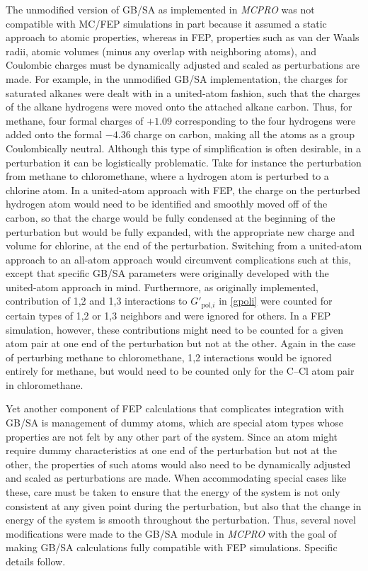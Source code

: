\documentclass[12pt]{report}
\begin{document}
The unmodified version of GB/SA as implemented in \textit{MCPRO} was not compatible with MC/FEP simulations in part because it assumed a static approach to atomic properties, whereas in FEP, properties such as van der Waals radii, atomic volumes (minus any overlap with neighboring atoms), and Coulombic charges must be dynamically adjusted and scaled as perturbations are made. For example, in the unmodified GB/SA implementation, the charges for saturated alkanes were dealt with in a united-atom fashion, such that the charges of the alkane hydrogens were moved onto the attached alkane carbon. Thus, for methane, four formal charges of $+1.09$ corresponding to the four hydrogens were added onto the formal $-4.36$ charge on carbon, making all the atoms as a group Coulombically neutral. Although this type of simplification is often desirable, in a perturbation it can be logistically problematic. Take for instance the perturbation from methane to chloromethane, where a hydrogen atom is perturbed to a chlorine atom. In a united-atom approach with FEP, the charge on the perturbed hydrogen atom would need to be identified and smoothly moved off of the carbon, so that the charge would be fully condensed at the beginning of the perturbation but would be fully expanded, with the appropriate new charge and volume for chlorine, at the end of the perturbation. Switching from a united-atom approach to an all-atom approach would circumvent complications such at this, except that specific GB/SA parameters were originally developed with the united-atom approach in mind. Furthermore, as originally implemented, contribution of 1,2 and 1,3 interactions to $G'_{\textrm{pol,}i}$ in \cref{gpoli} were counted for certain types of 1,2 or 1,3 neighbors and were ignored for others. In a FEP simulation, however, these contributions might need to be counted for a given atom pair at one end of the perturbation but not at the other. Again in the case of perturbing methane to chloromethane, 1,2 interactions would be ignored entirely for methane, but would need to be counted only for the C--Cl atom pair in chloromethane.

Yet another component of FEP calculations that complicates integration with GB/SA is management of dummy atoms, which are special atom types whose properties are not felt by any other part of the system. Since an atom might require dummy characteristics at one end of the perturbation but not at the other, the properties of such atoms would also need to be dynamically adjusted and scaled as perturbations are made. When accommodating special cases like these, care must be taken to ensure that the energy of the system is not only consistent at any given point during the perturbation, but also that the change in energy of the system is smooth throughout the perturbation. Thus, several novel modifications were made to the GB/SA module in \textit{MCPRO} with the goal of making GB/SA calculations fully compatible with FEP simulations. Specific details follow.
\end{document}
